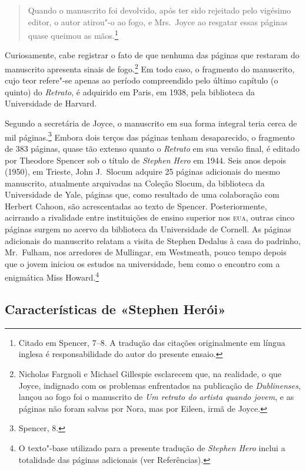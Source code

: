 \begin{quote}
Quando o manuscrito foi devolvido,
após ter sido rejeitado pelo vigésimo editor, o autor atirou"-o ao fogo,
e Mrs.~Joyce ao resgatar essas páginas quase queimou as mãos.\footnote{
Citado em Spencer, 7--8. A tradução das citações originalmente em
língua inglesa é responsabilidade do autor do presente ensaio.} 
\end{quote}

Curiosamente, cabe registrar o fato de que nenhuma das páginas que
restaram do manuscrito apresenta sinais de fogo.\footnote{ Nicholas Fargnoli e Michael Gillespie 
esclarecem que, na realidade, o que Joyce, indignado com os problemas enfrentados na publicação 
de \textit{Dublinenses}, lançou ao fogo foi o manuscrito de \textit{Um retrato do artista quando jovem}, 
e as páginas não foram salvas por Nora, mas por Eileen, irmã de Joyce.}  Em todo caso, o
fragmento do manuscrito, cujo teor refere"-se apenas ao período
compreendido pelo último capítulo (o quinto) do \textit{Retrato}, é
adquirido em Paris, em 1938, pela biblioteca da Universidade de
Harvard.

Segundo a secretária de Joyce, o manuscrito em sua forma integral teria
cerca de mil páginas.\footnote{ Spencer, 8.} Embora dois terços das páginas
tenham desaparecido, o fragmento de 383 páginas, quase tão extenso
quanto o \textit{Retrato} em sua versão final, é editado por Theodore
Spencer sob o título de \textit{Stephen Hero} em 1944.  
Seis anos depois (1950), em Trieste, John J.~Slocum adquire
25 páginas adicionais do mesmo manuscrito, atualmente
arquivadas na Coleção Slocum, da biblioteca da Universidade de Yale,
páginas que, como resultado de uma colaboração com Herbert Cahoon, são
acrescentadas ao texto de Spencer.  Posteriormente, acirrando a
rivalidade entre instituições de ensino superior nos \textsc{eua}, outras cinco
páginas surgem no acervo da biblioteca da Universidade de Cornell.  As
páginas adicionais do manuscrito relatam a visita de Stephen Dedalus à
casa do padrinho, Mr.~Fulham, nos arredores de Mullingar, em Westmeath,
pouco tempo depois que o jovem iniciou os estudos na universidade, bem
como o encontro com a enigmática Miss Howard.\footnote{ O texto"-base
utilizado para a presente tradução de \textit{Stephen Hero} inclui a
totalidade das páginas adicionais (ver Referências).}


\subsection*{Características de «Stephen Herói»}

